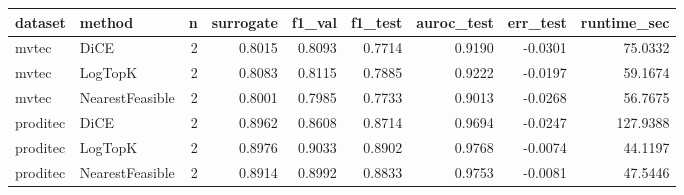 \begin{tabular}{llrrrrrrr}
\toprule
 dataset &          method &  n &  surrogate &  f1\_val &  f1\_test &  auroc\_test &  err\_test &  runtime\_sec \\
\midrule
   mvtec &            DiCE &  2 &     0.8015 &  0.8093 &   0.7714 &      0.9190 &   -0.0301 &      75.0332 \\
   mvtec &         LogTopK &  2 &     0.8083 &  0.8115 &   0.7885 &      0.9222 &   -0.0197 &      59.1674 \\
   mvtec & NearestFeasible &  2 &     0.8001 &  0.7985 &   0.7733 &      0.9013 &   -0.0268 &      56.7675 \\
proditec &            DiCE &  2 &     0.8962 &  0.8608 &   0.8714 &      0.9694 &   -0.0247 &     127.9388 \\
proditec &         LogTopK &  2 &     0.8976 &  0.9033 &   0.8902 &      0.9768 &   -0.0074 &      44.1197 \\
proditec & NearestFeasible &  2 &     0.8914 &  0.8992 &   0.8833 &      0.9753 &   -0.0081 &      47.5446 \\
\bottomrule
\end{tabular}
